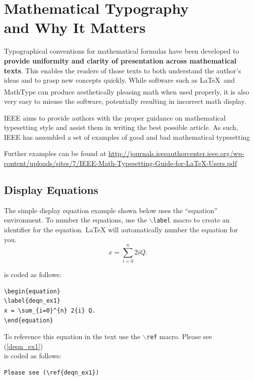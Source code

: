 \documentclass[journal]{IEEEtran}
\begin{document}
\section{Mathematical Typography \\ and Why It Matters}

Typographical conventions for mathematical formulas have been developed to {\bf provide uniformity and clarity of presentation across mathematical texts}. This enables the readers of those texts to both understand the author's ideas and to grasp new concepts quickly. While software such as \LaTeX \ and MathType\textsuperscript{\textregistered} can produce aesthetically pleasing math when used properly, it is also very easy to misuse the software, potentially resulting in incorrect math display.

IEEE aims to provide authors with the proper guidance on mathematical typesetting style and assist them in writing the best possible article. As such, IEEE has assembled a set of examples of good and bad mathematical typesetting 

Further examples can be found at \url{http://journals.ieeeauthorcenter.ieee.org/wp-content/uploads/sites/7/IEEE-Math-Typesetting-Guide-for-LaTeX-Users.pdf}

\subsection{Display Equations}
The simple display equation example shown below uses the ``equation'' environment. To number the equations, use the $\backslash${\tt{label}} macro to create an identifier for the equation. LaTeX will automatically number the equation for you.
\begin{equation}
\label{deqn_ex1}
x = \sum_{i=0}^{n} 2{i} Q.
\end{equation}

\noindent is coded as follows:
\begin{verbatim}
\begin{equation}
\label{deqn_ex1}
x = \sum_{i=0}^{n} 2{i} Q.
\end{equation}
\end{verbatim}

To reference this equation in the text use the $\backslash${\tt{ref}} macro. 
Please see (\ref{deqn_ex1})\\
\noindent is coded as follows:
\begin{verbatim}
Please see (\ref{deqn_ex1})\end{verbatim}
\end{document}
